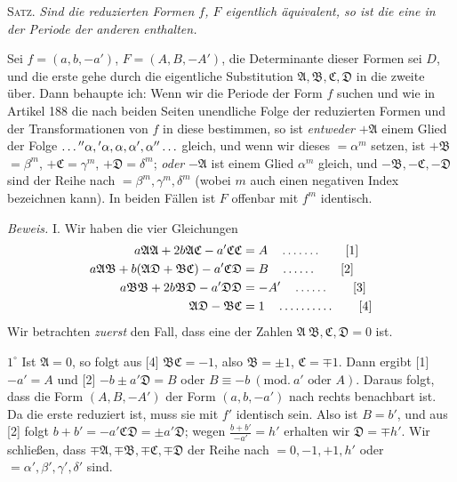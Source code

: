 \textsc{Satz.} \textit{Sind die reduzierten Formen $f$, $F$ eigentlich äquivalent, so ist die eine in der Periode der anderen enthalten.}

Sei $f=(a,b,-a')$, $F=(A,B,-A')$, die Determinante dieser Formen sei $D$, und die erste gehe durch die eigentliche Substitution $\mathfrak{A},\mathfrak{B},\mathfrak{C},\mathfrak{D}$ in die zweite über. Dann behaupte ich: Wenn wir die Periode der Form $f$ suchen und wie in Artikel 188 die nach beiden Seiten unendliche Folge der reduzierten Formen und der Transformationen von $f$ in diese bestimmen, so ist \textit{entweder} $+\mathfrak{A}$ einem Glied der Folge $\mathinner{\ldotp\ldotp\ldotp}{}''\alpha,{}'\alpha,\alpha,\alpha',\alpha''\mathinner{\ldotp\ldotp\ldotp}$ gleich, und wenn wir dieses $=\alpha^m$ setzen, ist $+\mathfrak{B}$ $=\beta^m$, $+\mathfrak{C}=\gamma^m$, $+\mathfrak{D}=\delta^m$; \textit{oder} $-\mathfrak{A}$ ist einem Glied $\alpha^m$ gleich, und $-\mathfrak{B},-\mathfrak{C},-\mathfrak{D}$ sind der Reihe nach $=\beta^m,\gamma^m,\delta^m$ (wobei $m$ auch einen negativen Index bezeichnen kann). In beiden Fällen ist $F$ offenbar mit $f^m$ identisch.

\textit{Beweis.} I. Wir haben die vier Gleichungen
\begin{align*}
a\mathfrak{A}\mathfrak{A}+2b\mathfrak{A}\mathfrak{C}-a'\mathfrak{C}\mathfrak{C}&=A \quad \mathinner{\ldotp\ldotp\ldotp\ldotp\ldotp\ldotp\ldotp} \tag*{[1]}\\
a\mathfrak{A}\mathfrak{B}+b(\mathfrak{A}\mathfrak{D}+\mathfrak{B}\mathfrak{C})-a'\mathfrak{C}\mathfrak{D}&=B \quad \mathinner{\ldotp\ldotp\ldotp\ldotp\ldotp\ldotp} \tag*{[2]}\\
a\mathfrak{B}\mathfrak{B}+2b\mathfrak{B}\mathfrak{D}-a'\mathfrak{D}\mathfrak{D}&=-A' \quad \mathinner{\ldotp\ldotp\ldotp\ldotp\ldotp\ldotp} \tag*{[3]}\\
\mathfrak{A}\mathfrak{D}-\mathfrak{B}\mathfrak{C}&=1 \quad \mathinner{\ldotp\ldotp\ldotp\ldotp\ldotp\ldotp\ldotp\ldotp\ldotp\ldotp} \tag*{[4]}
\end{align*}
Wir betrachten \textit{zuerst} den Fall, dass eine der Zahlen $\mathfrak{A}\ \mathfrak{B},\mathfrak{C},\mathfrak{D}=0$ ist.

$1^\circ$ Ist $\mathfrak{A}=0$, so folgt aus [4] $\mathfrak{B}\mathfrak{C}=-1$, also $\mathfrak{B}=\pm1$, $\mathfrak{C}=\mp1$. Dann ergibt [1] $-a'=A$ und [2] $-b\pm a'\mathfrak{D}=B$ oder $B\equiv-b\ (\mathrm{mod.}\ a'\text{ oder }A)$. Daraus folgt, dass die Form $(A,B,-A')$ der Form $(a,b,-a')$ nach rechts benachbart ist. Da die erste reduziert ist, muss sie mit $f'$ identisch sein. Also ist $B=b'$, und aus [2] folgt $b+b'=-a'\mathfrak{C}\mathfrak{D}=\pm a'\mathfrak{D}$; wegen $\frac{b+b'}{-a'}=h'$ erhalten wir $\mathfrak{D}=\mp h'$. Wir schließen, dass $\mp\mathfrak{A},\mp\mathfrak{B},\mp\mathfrak{C},\mp\mathfrak{D}$ der Reihe nach $=0,-1,+1,h'$ oder $=\alpha',\beta',\gamma',\delta'$ sind.

